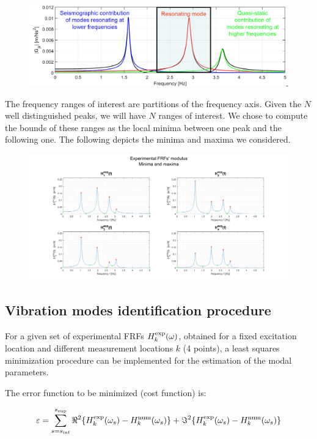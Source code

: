 \documentclass[a4paper,12pt,oneside]{article}
\begin{document}
\begin{figure}[H]
	\includegraphics[scale=0.4]{frf_num_regions}
\end{figure}

The frequency ranges of interest are partitions of the frequency axis. Given the $ N $ well distinguished peaks, we will have $ N $ ranges of interest. We chose to compute the bounds of these ranges as the local minima between one peak and the following one. The following depicts the minima and maxima we considered.

\begin{figure}[h]
	\hspace{-70pt}
	\includegraphics[scale=0.4]{experimental_frfs_modulus_min_max}
\end{figure}

\subsection{Vibration modes identification procedure}

For a given set of experimental FRFs $ H^\textup{exp}_k(\omega) $, obtained for a fixed excitation location and different measurement locations $ k $ (4 points), a least squares minimization procedure can be implemented for the estimation of the modal parameters.

The error function to be minimized (cost function) is:

\[
	\varepsilon = \sum_{s=s_\textup{inf}}^{s_\textup{sup}}
		\Re^2\{H^\textup{exp}_k(\omega_s) - H^\textup{num}_k(\omega_s)\} +
		\Im^2\{H^\textup{exp}_k(\omega_s) - H^\textup{num}_k(\omega_s)\}
\]
\end{document}
